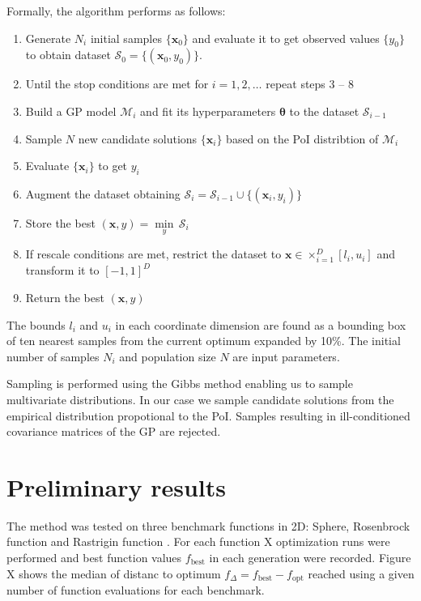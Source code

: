 \documentclass{sig-alternate}
\newcommand{\xx}{\mathrm{\mathbf{x}}}
\newcommand{\ttheta}{\mathbf{\theta}}
\begin{document}
Formally, the algorithm performs as follows:
\begin{enumerate}[itemsep=-4pt]
  \item Generate $N_i$ initial samples $\{\xx_0\}$ and evaluate it to get observed values $\{y_0\}$ to obtain
    dataset $\mathcal{S}_0 = \{(\xx_0, y_0)\}$.
  \item Until the stop conditions are met for $i = 1, 2, \dots$ repeat steps 3 -- 8
  \item Build a GP model $\mathcal{M}_i$ and fit its hyperparameters $\ttheta$ to the dataset $\mathcal{S}_{i-1}$
  \item Sample $N$ new candidate solutions $\{\xx_i\}$ based on the PoI distribtion of $\mathcal{M}_i$
  \item Evaluate $\{\xx_i\}$ to get ${y_i}$ 
  \item Augment the dataset obtaining $\mathcal{S}_i = \mathcal{S}_{i-1} \cup \{(\xx_i, y_i)\}$
  \item Store the best $(\xx, y) = \underset{y}{\min} \, \mathcal{S}_i$
  \item If rescale conditions are met, restrict the dataset to $\xx \in \times_{i=1}^D [l_i, u_i]$ and
    transform it to $[-1, 1]^D$
  \item Return the best $(\xx, y)$
\end{enumerate}
The bounds $l_i$ and $u_i$ in each coordinate dimension are found as a bounding box of ten nearest samples 
from the current optimum expanded by 10\%. The initial number of samples $N_i$ and population size $N$ are 
input parameters.

Sampling is performed using the Gibbs method \cite{geman1984stochastic} enabling us to sample multivariate 
distributions. In our case we sample candidate solutions from  the empirical distribution propotional to 
the PoI. Samples resulting in ill-conditioned covariance matrices of the GP are rejected.

\section{Preliminary results}

The method was tested on three benchmark functions in 2D: Sphere, Rosenbrock function and Rastrigin function 
\cite{molga05functions}. For each function X optimization runs were performed and best function values 
$f_{\text{best}}$ in each generation were recorded. Figure X shows the median of distanc to optimum 
$f_{\Delta} = f_{\text{best}} - f_{\text{opt}}$ reached using a given number of function evaluations
for each benchmark.
\end{document}
